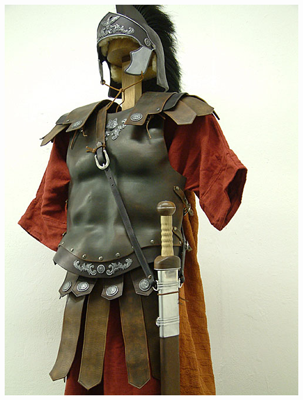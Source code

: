 \documentclass[xcolor=table,serif,handout]{beamer}
\begin{document}
\begin{frame}
\begin{columns}
	\centerline{\includegraphics[scale=0.09]{roman_armour.jpg}}


\end{columns}
\end{frame}
\end{document}
